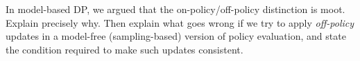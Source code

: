 \begin{exercise}
\label{ex:dp-on-off-policy}
In model-based DP, we argued that the on-policy/off-policy distinction is moot.  Explain precisely why.  Then explain what goes wrong if we try to apply \emph{off-policy} updates in a model-free (sampling-based) version of policy evaluation, and state the condition required to make such updates consistent.
\end{exercise}
